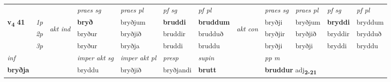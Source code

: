 \begin{longtable}[l]{X>{\footnotesize\itshape}llXXXXlXXXX}
\midrule

 & &   & \textit{praes sg}  & \textit{praes pl}    & \textit{ pf sg} & \textit{pf pl} & & \textit{praes sg}  & \textit{praes pl}    & \textit{pf sg} & \textit{pf pl }  \\ \cmidrule{4-7} \cmidrule{9-12}
 \multirow{2}{*}{{{\textbf{v{\textsubscript{4}}} \Large{\textbf{41}}}}}  & 1p & \multirow{3}{*}{\begin{turn}{90}\textit{akt ind}\end{turn}} & \textbf{bryð} & bryðjum & \textbf{bruddi} & \textbf{bruddum} & \multirow{3}{*}{\begin{turn}{90}\textit{akt con}\end{turn}} &bryðji & bryðjum & \textbf{bryddi} & bryddum\\*
 & 2p &  &  bryður  & bryðjið & bruddir & brudduð & & bryðjir & bryðjið & bryddir & brydduð \\*
 & 3p &  & bryður & bryðja & bruddi & bruddu & & bryðji & bryðji& bryddi & bryddu \\*
\cmidrule{4-7} \cmidrule{9-12}

   {\textit{inf}} & &  & \textit{imper akt sg} & \textit{imper akt pl}   & \textit{presp} & \textit{supin}  && \textit{pp m} \\*
  {\textbf{bryðja}} & && bryddu  & bryðjið   & bryðjandi &  \textbf{brutt}  && \multicolumn{2}{l}{\textbf{bruddur} adj\textbf{\textsubscript{2-21}}} \\*

\midrule


\end{longtable}
